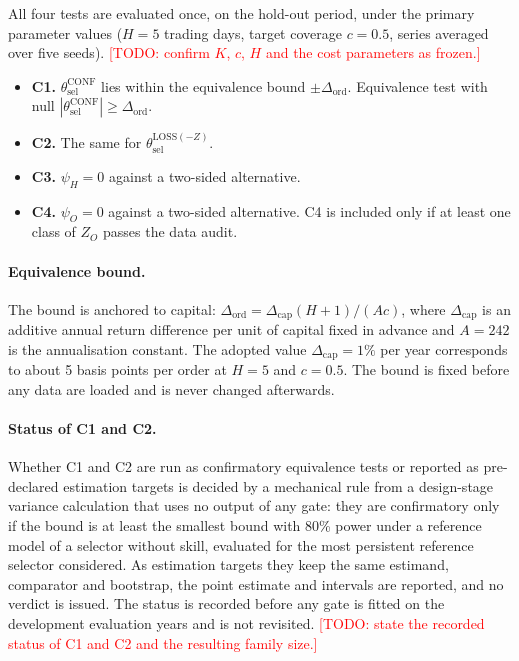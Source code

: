 \documentclass[11pt]{article}
\theoremstyle{remark}
\newcommand{\todo}[1]{\textcolor{red}{[TODO: #1]}}
\newcommand{\thetasel}{\theta_{\mathrm{sel}}}
\newcommand{\ZO}{Z_O}
\begin{document}
All four tests are evaluated once, on the hold-out period, under the primary parameter values
($H=5$ trading days, target coverage $c=0.5$, series averaged over five seeds).
\todo{confirm $K$, $c$, $H$ and the cost parameters as frozen.}
\begin{itemize}
\item \textbf{C1.} $\thetasel^{\mathrm{CONF}}$ lies within the equivalence bound
$\pm\Delta_{\mathrm{ord}}$. Equivalence test with null
$|\thetasel^{\mathrm{CONF}}|\ge\Delta_{\mathrm{ord}}$.
\item \textbf{C2.} The same for $\thetasel^{\mathrm{LOSS}(-Z)}$.
\item \textbf{C3.} $\psi_H=0$ against a two-sided alternative.
\item \textbf{C4.} $\psi_O=0$ against a two-sided alternative. C4 is included only if at least
one class of $\ZO$ passes the data audit.
\end{itemize}

\paragraph{Equivalence bound.}
The bound is anchored to capital: $\Delta_{\mathrm{ord}}=\Delta_{\mathrm{cap}}(H+1)/(Ac)$, where
$\Delta_{\mathrm{cap}}$ is an additive annual return difference per unit of capital fixed in
advance and $A=242$ is the annualisation constant. The adopted value
$\Delta_{\mathrm{cap}}=1\%$ per year corresponds to about 5 basis points per order at $H=5$ and
$c=0.5$. The bound is fixed before any data are loaded and is never changed afterwards.

\paragraph{Status of C1 and C2.}
Whether C1 and C2 are run as confirmatory equivalence tests or reported as pre-declared
estimation targets is decided by a mechanical rule from a design-stage variance calculation that
uses no output of any gate: they are confirmatory only if the bound is at least the smallest
bound with 80\% power under a reference model of a selector without skill, evaluated for the
most persistent reference selector considered. As estimation targets they keep the same
estimand, comparator and bootstrap, the point estimate and intervals are reported, and no
verdict is issued. The status is recorded before any gate is fitted on the development
evaluation years and is not revisited.
\todo{state the recorded status of C1 and C2 and the resulting family size.}
\end{document}
